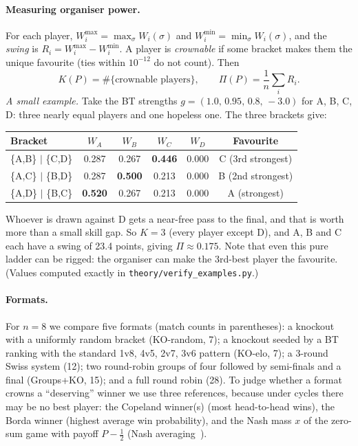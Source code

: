 \documentclass[11pt]{article}
\theoremstyle{remark}
\newcommand{\Wmax}{W^{\max}}
\newcommand{\Wmin}{W^{\min}}
\begin{document}
\paragraph{Measuring organiser power.} For each player, $\Wmax_i=\max_\sigma W_i(\sigma)$ and $\Wmin_i=\min_\sigma W_i(\sigma)$,
and the \emph{swing} is $R_i=\Wmax_i-\Wmin_i$. A player is \emph{crownable} if some bracket makes them the unique favourite
(ties within $10^{-12}$ do not count). Then
\[
K(P)=\#\{\text{crownable players}\},\qquad \Pi(P)=\frac1n\sum_i R_i .
\]
\emph{A small example.} Take the BT strengths $g=(1.0,\,0.95,\,0.8,\,-3.0)$ for A, B, C, D: three nearly equal players and one
hopeless one. The three brackets give:
\begin{center}
\small
\begin{tabular}{lccccc}
\toprule
Bracket & $W_A$ & $W_B$ & $W_C$ & $W_D$ & Favourite \\
\midrule
\{A,B\} $|$ \{C,D\} & 0.287 & 0.267 & \textbf{0.446} & 0.000 & C (3rd strongest) \\
\{A,C\} $|$ \{B,D\} & 0.287 & \textbf{0.500} & 0.213 & 0.000 & B (2nd strongest) \\
\{A,D\} $|$ \{B,C\} & \textbf{0.520} & 0.267 & 0.213 & 0.000 & A (strongest) \\
\bottomrule
\end{tabular}
\end{center}
Whoever is drawn against D gets a near-free pass to the final, and that is worth more than a small skill gap. So $K=3$ (every
player except D), and A, B and C each have a swing of 23.4 points, giving $\Pi\approx0.175$. Note that even this pure ladder
can be rigged: the organiser can make the 3rd-best player the favourite. (Values computed exactly in
\texttt{theory/verify\_examples.py}.)

\paragraph{Formats.} For $n=8$ we compare five formats (match counts in parentheses): a knockout with a uniformly random bracket
(KO-random, 7); a knockout seeded by a BT ranking with the standard 1v8, 4v5, 2v7, 3v6 pattern (KO-elo, 7); a 3-round Swiss
system (12); two round-robin groups of four followed by semi-finals and a final (Groups+KO, 15); and a full round robin (28).
To judge whether a format crowns a ``deserving'' winner we use three references, because under cycles there may be no best
player: the Copeland winner(s) (most head-to-head wins), the Borda winner (highest average win probability), and the Nash
mass $x$ of the zero-sum game with payoff $P-\tfrac12$ (Nash averaging~\cite{balduzzi2018reevaluating}).
\end{document}
